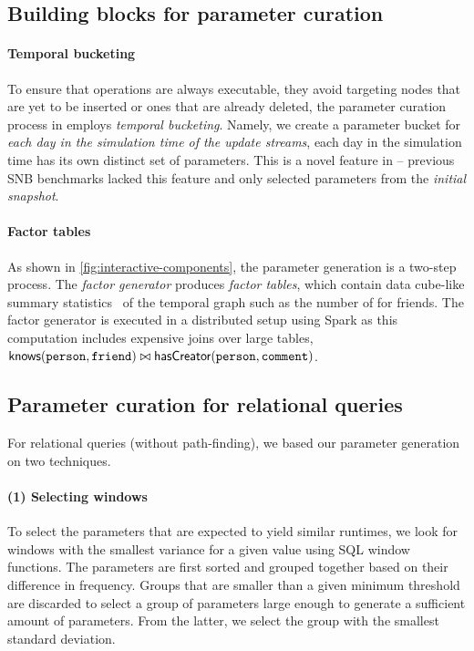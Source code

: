\subsection{Building blocks for parameter curation}

\paragraph{Temporal bucketing}
\label{sec:temporal-bucketing}
%
To ensure that operations are always executable, \ie they avoid targeting nodes that are yet to be inserted or ones that are already deleted, the parameter curation process in \interactivevtwo employs \emph{temporal bucketing}.
Namely, we create a parameter bucket for \emph{each day in the simulation time of the update streams},
\ie each day in the simulation time has its own distinct set of parameters.
This is a novel feature in \interactivevtwo{} -- previous SNB benchmarks lacked this feature and only selected parameters from the \emph{initial snapshot}.

\paragraph{Factor tables}
As shown in \autoref{fig:interactive-components}, the parameter generation is a two-step process.
The \emph{factor generator} produces \emph{factor tables}, which contain data cube-like summary statistics~\cite{DBLP:journals/datamine/GrayCBLRVPP97} of the temporal graph such as the number of \Messages for friends.
The factor generator is executed in a distributed setup using Spark as this computation includes expensive joins over large tables,
\eg $\textsf{knows}(\texttt{person}, \texttt{friend}) \bowtie \textsf{hasCreator}(\texttt{person}, \texttt{comment})$.


\subsection{Parameter curation for relational queries}

For relational queries (without path-finding), we based our parameter generation on two techniques.

\paragraph{(1) Selecting windows}
%
To select the parameters that are expected to yield similar runtimes, we look for windows with the smallest variance for a given value using SQL window functions.
The parameters are first sorted and grouped together based on their difference in frequency.
Groups that are smaller than a given minimum threshold are discarded to select a group of
parameters large enough to generate a sufficient amount of parameters.
From the latter, we select
the group with the smallest standard deviation.

